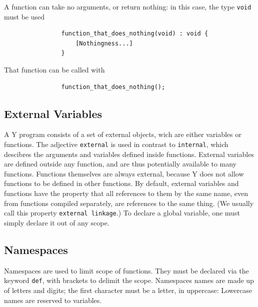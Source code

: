 \documentclass{scrartcl}
\begin{document}
            A function can take no arguments, or return nothing: in this case,
            the type \texttt{void} must be used
            \begin{lstlisting}
                function_that_does_nothing(void) : void {
                    [Nothingness...]
                }
            \end{lstlisting}
            That function can be called with
            \begin{lstlisting}
                function_that_does_nothing();
            \end{lstlisting}

        \subsection{External Variables}
            A Y program consists of a set of external objects, wich are either
            variables or functions. The adjective \texttt{external} is used in
            contrast to \texttt{internal}, which descibres the arguments and
            variables defined inside functions. External variables are defined
            outside any function, and are thus potentially available to many
            functions. Functions themselves are always external, because Y
            does not allow functions to be defined in other functions. By
            default, external variables and functions have the property that
            all references to them by the same name, even from functions compiled
            separately, are references to the same thing. (We usually call this
            property \texttt{external linkage}.) To declare a global variable,
            one must simply declare it out of any scope.
        \subsection{Namespaces} \label{namespaces}
            Namespaces are used to limit scope of functions. They must be declared
            via the keyword \texttt{def}, with brackets to delimit the scope.
            Namespaces names are made up of letters and digits; the first character
            must be a letter, in uppercase: Lowercase names are reserved to variables.
\end{document}
